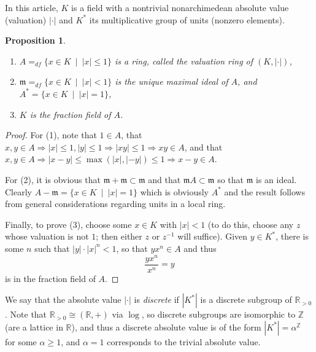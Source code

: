 \documentclass[12pt]{article}
\newcommand{\Abs}[1]{\left\lvert #1\right\rvert}
\newcommand{\BR}{\mathbb{R}}
\newcommand{\BZ}{\mathbb{Z}}
\newcommand{\suchthat}{\ \mid\ }
\newcommand{\smm}{\mathfrak{m}}
\newcommand{\U}[1]{{#1}^*}
\newtheorem{prop}[thm]{Proposition}
\begin{document}
In this article, $K$ is a field with a nontrivial nonarchimedean absolute value (valuation) $\Abs\cdot$ and $\U{K}$ its multiplicative group of units (nonzero elements).

\begin{prop} ~
\newline
\begin{enumerate} \item $A=_{df}\{x\in K\suchthat \Abs x\leq 1\}$ is a ring, called the \emph{valuation ring} of $(K,\Abs{\cdot})$,
\item $\smm =_{df}\{x\in K\suchthat \Abs x < 1\}$ is the unique maximal ideal of $A$, and $\U{A}=\{x\in K\suchthat \Abs x =1\}$,
\item $K$ is the fraction field of $A$.
\end{enumerate}
\end{prop}

\begin{proof} For (1), note that $1\in A$, that $x,y\in A\Rightarrow \Abs x\leq 1, \Abs y \leq 1\Rightarrow\Abs{xy} \leq 1\Rightarrow xy\in A$, and that $x,y\in A\Rightarrow \Abs{x-y}\leq\max(\Abs x,\Abs {-y})\leq 1\Rightarrow x-y\in A$.

For (2), it is obvious that $\smm+\smm\subset\smm$ and that $\smm A\subset\smm$ so that $\smm$ is an ideal. Clearly $A-\smm = \{x\in K\suchthat \Abs x = 1\}$ which is obviously $\U{A}$ and the result follows from general considerations regarding units in a local ring.

Finally, to prove (3), choose some $x\in K$ with $\Abs x < 1$ (to do this, choose any $z$ whose valuation is not $1$; then either $z$ or $z^{-1}$ will suffice). Given $y\in\U{K}$, there is some $n$ such that $\Abs y\cdot\Abs{x}^n<1$, so that $yx^n\in A$ and thus
\[\frac{yx^n}{x^n}= y\]
is in the fraction field of $A$.
\end{proof}

We say that the absolute value $\Abs{\cdot}$ is \emph{discrete} if $\Abs{\U{K}}$ is a discrete subgroup of $\BR_{>0}$. Note that $\BR_{>0}\cong (\BR,+)$ via $\log$, so discrete subgroups are isomorphic to $\BZ$ (are a lattice in $\BR$), and thus a discrete absolute value is of the form $\Abs{\U{K}} = \alpha^{\BZ}$ for some $\alpha\geq 1$, and $\alpha=1$ corresponds to the trivial absolute value.
\end{document}
